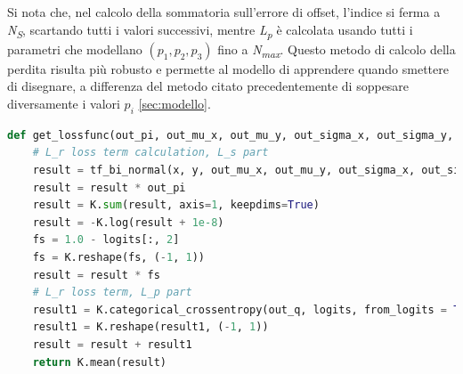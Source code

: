 Si nota che, nel calcolo della sommatoria sull'errore di offset, l'indice si ferma a \textit{N\textsubscript{S}}, scartando tutti i valori successivi, mentre \textit{L\textsubscript{p}} è calcolata usando tutti i parametri che modellano $(p_1, p_2, p_3)$ fino a \textit{N\textsubscript{max}}. Questo metodo di calcolo della perdita risulta più robusto e permette al modello di apprendere quando smettere di disegnare, a differenza del metodo citato precedentemente di soppesare diversamente i valori $p_i$ \ref{sec:modello}.

\begin{minipage}{\linewidth}
\begin{lstlisting}[language = Python, frame = single, caption = {Implementazione in Keras del calcolo dell'errore di ricostruzione, suddiviso fra i termini dell'errore nell'offset $(L_s)$ e l'errore degli stati della penna $(L_p)$}, captionpos = b]
def get_lossfunc(out_pi, out_mu_x, out_mu_y, out_sigma_x, out_sigma_y, out_ro, out_q, x, y, logits):
    # L_r loss term calculation, L_s part
    result = tf_bi_normal(x, y, out_mu_x, out_mu_y, out_sigma_x, out_sigma_y, out_ro)
    result = result * out_pi
    result = K.sum(result, axis=1, keepdims=True)
    result = -K.log(result + 1e-8)
    fs = 1.0 - logits[:, 2]
    fs = K.reshape(fs, (-1, 1))
    result = result * fs
    # L_r loss term, L_p part
    result1 = K.categorical_crossentropy(out_q, logits, from_logits = True)
    result1 = K.reshape(result1, (-1, 1))
    result = result + result1
    return K.mean(result)
\end{lstlisting}
\end{minipage}

